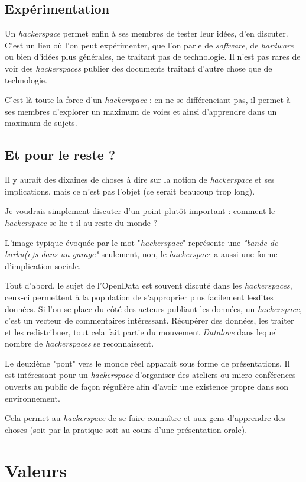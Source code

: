 \documentclass[a4paper, 11pt]{report}
\newcommand{\hs}{{\itshape hackerspace}}
\newcommand{\hsss}{{\itshape hackerspaces}}
\newcommand{\hw}{{\itshape hardware}}
\newcommand{\sw}{{\itshape software}}
\begin{document}
    \subsection{Expérimentation}

Un \hs{} permet enfin à ses membres de tester leur idées, d'en discuter. C'est un lieu où l'on peut expérimenter, que l'on
parle de \sw, de \hw{} ou bien d'idées plus générales, ne traitant pas de technologie. Il n'est pas rares de voir des
\hsss{} publier des documents traitant d'autre chose que de technologie.

C'est là toute la force d'un \hs{} : en ne se différenciant pas, il permet à ses membres d'explorer un maximum de voies et
ainsi d'apprendre dans un maximum de sujets.

    \subsection{Et pour le reste ?}

Il y aurait des dixaines de choses à dire sur la notion de \hs{} et ses implications, mais ce n'est pas l'objet (ce serait
beaucoup trop long).

Je voudrais simplement discuter d'un point plutôt important : comment le \hs{} se lie-t-il au reste du monde ?

L'image typique évoquée par le mot "\hs" représente une {\it "bande de barbu(e)s dans un garage"} seulement, non, le
\hs{} a aussi une forme d'implication sociale.

Tout d'abord, le sujet de l'OpenData est souvent discuté dans les \hsss, ceux-ci permettent à la population de
s'approprier plus facilement lesdites données. Si l'on se place du côté des acteurs publiant les données, un \hs,
c'est un vecteur de commentaires intéressant. Récupérer des données, les traiter et les redistribuer, tout cela fait
partie du mouvement {\it Datalove} dans lequel nombre de \hsss{} se reconnaissent.

Le deuxième "pont" vers le monde réel apparait sous forme de présentations. Il est intéressant pour un \hs{} d'organiser
des ateliers ou micro-conférences ouverts au public de façon régulière afin d'avoir une existence propre dans son
environnement.

Cela permet au \hs{} de se faire connaître et aux gens d'apprendre des choses (soit par la pratique soit au cours d'une
présentation orale).

    \section{Valeurs}
\end{document}
